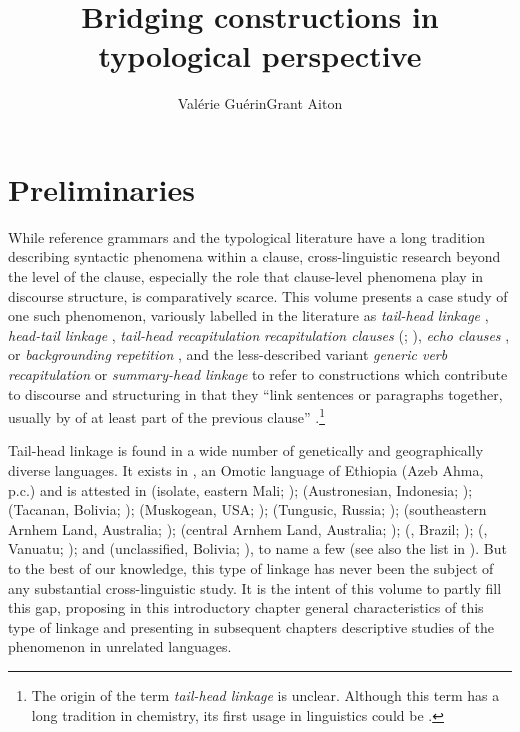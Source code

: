 \documentclass[output=paper]{LSP/langsci}
\author{Valérie Guérin\affiliation{James Cook University}\lastand Grant Aiton\affiliation{James Cook University}}
\title{Bridging constructions in typological perspective}
\begin{document}
\label{ch:1}
\section{Preliminaries}
\label{GuAi1prelim}

While reference grammars and the typological literature have a long tradition describing syntactic phenomena within a clause, cross-linguistic research beyond the level of the clause, especially the role that clause-level phenomena play in discourse structure, is comparatively scarce. This volume presents a case study of one such phenomenon, variously labelled in the literature as \textit{tail-head linkage} \citep{devries.2005}, \textit{head-tail linkage} \citep[][163]{fabian98}, \textit{tail-head recapitulation} \citep[][197]{farr99} \textit{recapitulation clauses} (\citealt[][438]{Genetti.2007}; \citealt[][17]{stirling93}), \textit{echo clauses} \citep{Heath18}, or \textit{backgrounding repetition} \citep[][10]{McKay.2008}, and the less-described variant \textit{generic verb recapitulation} \citep[][204, 337]{farr99} or \textit{summary-head linkage} \citep[][274]{Thompson.et.al.2007} to refer to constructions which contribute to discourse  and structuring in that they ``link sentences or paragraphs together, usually by  of at least part of the previous clause'' \citep[][342]{Thurman1975}.\footnote{The origin of the term \textit{tail-head linkage} is unclear. Although this term has a long tradition in chemistry, its first usage in linguistics could be \citet{Longacre.1968}.}  

Tail-head linkage is found in a wide number of genetically and geographically diverse languages. It exists in , an Omotic language of Ethiopia (Azeb Ahma, p.c.) and is attested in  (isolate, eastern Mali; \citealt{Heath18});  (Austronesian, Indonesia; \citealt{Plattel2013});  (Tacanan, Bolivia; \citealt{Guillaume2011});  (Muskogean, USA; \citealt{Martin1998});  (Tungusic, Russia; \citealt{Grenoble2012});  (southeastern Arnhem Land, Australia; \citealt{heath1985});  (central Arnhem Land, Australia; \citealt{McKay.2008});  (, Brazil; \citealt{aikhenvald19});  (, Vanuatu; \citealt{brotchie09}); and  (unclassified, Bolivia; \citealt{vangijn14}), to name a few (see also the list in \citealt[][111]{Guillaume2011}). But to the best of our knowledge, this type of linkage has never been the subject of any substantial cross-linguistic study. It is the intent of this volume to partly fill this gap, proposing in this introductory chapter general characteristics of this type of linkage and presenting in subsequent chapters descriptive studies of the phenomenon in unrelated languages.
\end{document}
